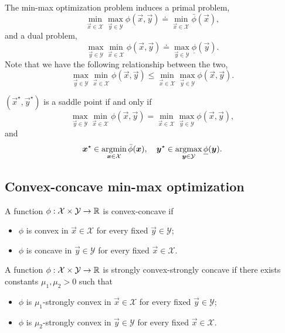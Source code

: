 The min-max optimization problem induces a primal problem, \[
    \min_{\vec{x} \in \mathcal{X}} \max_{\vec{y} \in \mathcal{Y}} \phi(\vec{x}, \vec{y}) \doteq \min_{\vec{x} \in \mathcal{X}} \bar{\phi}(\vec{x}),
\]
and a dual problem, \[
    \max_{\vec{y} \in \mathcal{Y}} \min_{\vec{x} \in \mathcal{X}} \phi(\vec{x}, \vec{y}) \doteq \max_{\vec{y} \in \mathcal{Y}} \underline{\phi}(\vec{y}).
\]
Note that we have the following relationship between the two, \[
    \max_{\vec{y} \in \mathcal{Y}} \min_{\vec{x} \in \mathcal{X}} \phi(\vec{x}, \vec{y}) \leq \min_{\vec{x} \in \mathcal{X}} \max_{\vec{y} \in \mathcal{Y}} \phi(\vec{x}, \vec{y}).
\]

\begin{lemma}
    $(\vec{x}^\star, \vec{y}^\star)$ is a saddle point if and only if \[
        \max_{\vec{y} \in \mathcal{Y}} \min_{\vec{x} \in \mathcal{X}} \phi(\vec{x}, \vec{y}) = \min_{\vec{x} \in \mathcal{X}} \max_{\vec{y} \in \mathcal{Y}} \phi(\vec{x}, \vec{y}),
    \]
    and \[
        \bm{x}^\star \in \operatorname*{argmin}_{\bm{x} \in \mathcal{X}} \bar{\phi}(\bm{x}), \quad \bm{y}^\star \in \operatorname*{argmax}_{\bm{y} \in \mathcal{Y}} \underline{\phi}(\bm{y}).
    \]
\end{lemma}

\subsection{Convex-concave min-max optimization}

\begin{definition}
    A function $\phi: \mathcal{X} \times \mathcal{Y} \to \mathbb{R}$ is convex-concave if
    \begin{itemize}
        \item $\phi$ is convex in $\vec{x} \in \mathcal{X}$ for every fixed $\vec{y} \in \mathcal{Y}$;
        \item $\phi$ is concave in $\vec{y} \in \mathcal{Y}$ for every fixed $\vec{x} \in \mathcal{X}$.
    \end{itemize}
\end{definition}

\begin{definition}
    A function $\phi: \mathcal{X} \times \mathcal{Y} \to \mathbb{R}$ is strongly convex-strongly concave if
    there exists constants $\mu_1, \mu_2 > 0$ such that
    \begin{itemize}
        \item $\phi$ is $\mu_1$-strongly convex in $\vec{x} \in \mathcal{X}$ for every fixed $\vec{y} \in \mathcal{Y}$;
        \item $\phi$ is $\mu_2$-strongly convex in $\vec{y} \in \mathcal{Y}$ for every fixed $\vec{x} \in \mathcal{X}$.
    \end{itemize}
\end{definition}


